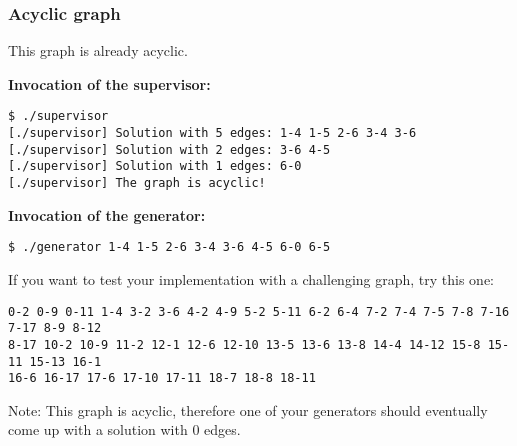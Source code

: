 \vspace{8mm}
\begin{multicols}{2}
\subsubsection*{Acyclic graph}


\vfill

This graph is already acyclic.

\columnbreak

\textbf{Invocation of the supervisor:}
\vspace{-5mm}
\begin{verbatim}
$ ./supervisor
[./supervisor] Solution with 5 edges: 1-4 1-5 2-6 3-4 3-6
[./supervisor] Solution with 2 edges: 3-6 4-5
[./supervisor] Solution with 1 edges: 6-0
[./supervisor] The graph is acyclic!
\end{verbatim}

\textbf{Invocation of the generator:}
\vspace{-5mm}
\begin{verbatim}
$ ./generator 1-4 1-5 2-6 3-4 3-6 4-5 6-0 6-5
\end{verbatim}
\end{multicols}

\vspace{8mm}
If you want to test your implementation with a challenging graph, try this one:

\texttt{0-2 0-9 0-11 1-4 3-2 3-6 4-2 4-9 5-2 5-11 6-2 6-4 7-2 7-4 7-5 7-8 7-16 7-17 8-9 8-12\\
8-17 10-2 10-9 11-2 12-1 12-6 12-10 13-5 13-6 13-8 14-4 14-12 15-8 15-11 15-13 16-1\\
16-6 16-17 17-6 17-10 17-11 18-7 18-8 18-11}

Note: This graph is acyclic,
therefore one of your generators should eventually come up with a solution with 0 edges.

\osueguidelinesone


